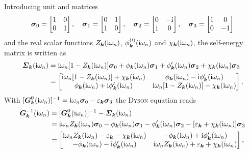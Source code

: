Introducing unit and  matrices
%
\begin{equation*}
    \boldsymbol \sigma_0 =
    \begin{bmatrix}
        1 & 0 \\
        0 & 1
    \end{bmatrix},
    \quad
    \boldsymbol \sigma_1 =
    \begin{bmatrix}
        0 & 1 \\
        1 & 0
    \end{bmatrix},
    \quad
    \boldsymbol \sigma_2 =
    \begin{bmatrix}
        0 & -\mathrm i \\
        \mathrm i & 0
    \end{bmatrix},
    \quad
    \boldsymbol \sigma_3 =
    \begin{bmatrix}
    1 & 0 \\
    0 & -1
    \end{bmatrix}
\end{equation*}
%
and the real scalar functions $Z_{\boldsymbol k}(\mathrm i \omega_n)$, $\phi^{(\prime)}_{\boldsymbol
k}(\mathrm i \omega_n)$ and $\chi_{\boldsymbol k}(\mathrm i \omega_n)$, the self-energy matrix is
written as
%
\begin{align} \label{self-energy matrix}
    \boldsymbol {\varSigma}_{\boldsymbol k}(\mathrm i \omega_n) &= \mathrm i \omega_n
    [1 - Z_{\boldsymbol k}(\mathrm i \omega_n)] \boldsymbol \sigma_0
    + \phi _{\boldsymbol k}(\mathrm i \omega_n) \boldsymbol \sigma_1
    + \phi'_{\boldsymbol k}(\mathrm i \omega_n) \boldsymbol \sigma_2
    + \chi _{\boldsymbol k}(\mathrm i \omega_n) \boldsymbol \sigma_3
    \\ \notag
    &=
    \begin{bmatrix}
        \mathrm i \omega_n [1 - Z_{\boldsymbol k}(\mathrm i \omega_n)] + \chi_{\boldsymbol k}(\mathrm i \omega_n) &
        \phi_{\boldsymbol k}(\mathrm i \omega_n) - \mathrm i \phi'_{\boldsymbol k}(\mathrm i \omega_n) \\
        \phi_{\boldsymbol k}(\mathrm i \omega_n) + \mathrm i \phi'_{\boldsymbol k}(\mathrm i \omega_n) &
        \mathrm i \omega_n [1 - Z_{\boldsymbol k}(\mathrm i \omega_n)] - \chi_{\boldsymbol k}(\mathrm i \omega_n)
    \end{bmatrix},
\end{align}
%
With $[\boldsymbol G^0_{\boldsymbol k}(\mathrm i \omega_n)]^{-1} = \mathrm i \omega_n \boldsymbol \sigma_0 -
\varepsilon_{\boldsymbol k} \boldsymbol \sigma_3$ the \textsc{Dyson} equation reads
%
\begin{align*}
    \boldsymbol G_{\boldsymbol k}^{-1}(\mathrm i \omega_n) &=
    [\boldsymbol G^0_{\boldsymbol k}(\mathrm i \omega_n)]^{-1} - \boldsymbol {\varSigma}_{\boldsymbol k}(\mathrm i \omega_n)
    \\
    &= \mathrm i \omega_n Z_{\boldsymbol k}(\mathrm i \omega_n) \boldsymbol \sigma_0
    - \phi _{\boldsymbol k}(\mathrm i \omega_n) \boldsymbol \sigma_1
    - \phi'_{\boldsymbol k}(\mathrm i \omega_n) \boldsymbol \sigma_2
    - [\varepsilon_{\boldsymbol k} + \chi_{\boldsymbol k}(\mathrm i \omega_n)] \boldsymbol \sigma_3 \\
    &= \begin{bmatrix}
        \mathrm i \omega_n Z_{\boldsymbol k}(\mathrm i \omega_n)
        - \varepsilon_{\boldsymbol k} - \chi_{\boldsymbol k}(\mathrm i \omega_n) &
        -\phi_{\boldsymbol k}(\mathrm i \omega_n) + \mathrm i \phi'_{\boldsymbol k}(\mathrm i \omega_n) \\
        -\phi_{\boldsymbol k}(\mathrm i \omega_n) - \mathrm i \phi'_{\boldsymbol k}(\mathrm i \omega_n) &
        \mathrm i \omega_n Z_{\boldsymbol k}(\mathrm i \omega_n)
        + \varepsilon_{\boldsymbol k} + \chi_{\boldsymbol k}(\mathrm i \omega_n)
    \end{bmatrix},
\end{align*}
